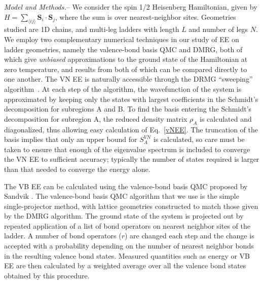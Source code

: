 \documentclass[prl,aps,twocolumn,floatfix,amsmath,amssymb,superscriptaddress,tightenlines]{revtex4}
\begin{document}
{\it Model and Methods.}-- We consider the spin 1/2 Heisenberg
Hamiltonian, given by  
$H =  \sum_{\langle i j \rangle}
{\mathbf S}_i \cdot {\mathbf S}_j \label{ham}$, 
where the sum
is over nearest-neighbor sites.  Geometries studied are 1D chains, and
multi-leg ladders with length $L$ and number of legs $N$.  
We employ two complementary numerical techniques in our study of EE on
ladder geometries, namely the valence-bond basis QMC and DMRG, both of
which give {\it unbiased} approximations to the ground state of the
Hamiltonian at zero temperature, and results from both of which can be
compared directly to one another.  The VN EE is naturally accessible
through the DRMG ``sweeping'' algorithm~\cite{White92, Scholl05}.  At each
step of the algorithm, the wavefunction of the system is approximated by
keeping only the states with largest coefficients in the Schmidt's
decomposition for subregions A and B. To find the basis entering the
Schmidt's decomposition for subregion A, the reduced density matrix
$\rho_A$ is calculated and diagonalized, thus allowing easy calculation
of Eq.~\eqref{vNEE}. The truncation of the basis implies that only an upper
bound for $S^{VN}_{A}$ is calculated, so care must be taken to ensure
that enough of the eigenvalue spectrum is included to converge the VN EE
to sufficient accuracy; typically the number of states required is larger
than that needed to converge the energy alone.

The VB EE \cite{Alet,Chh} can be calculated using the valence-bond basis
QMC proposed by Sandvik \cite{Sandvik}.  The valence-bond basis QMC
algorithm that we use is the simple single-projector method, with lattice
geometries constructed to match those given by the DMRG algorithm.  The
ground state of the system is projected out by repeated application of a
list of bond operators on nearest neighbor sites of the ladder.  A number
of bond operators ($r$) are changed each step and the change is accepted
with a probability depending on the number of nearest neighbor bonds in
the resulting valence bond states. Measured quantities such as energy or
VB EE are then calculated by a weighted average over all the valence bond
states obtained by this procedure.
\end{document}
